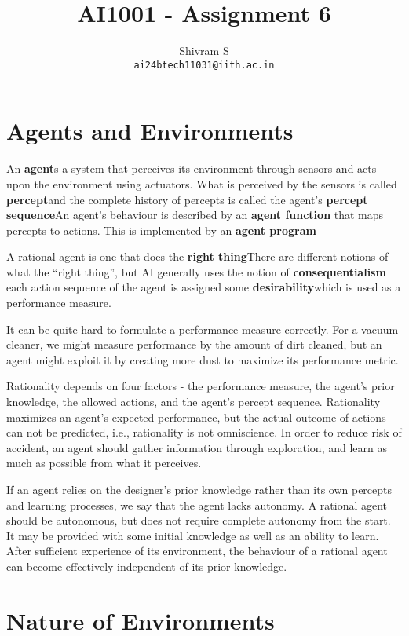 \documentclass{article}
\author{Shivram S \\ \texttt{ai24btech11031@iith.ac.in}}
\title{AI1001 - Assignment 6}
\begin{document}
\maketitle

\section{Agents and Environments}

An \textbf{agent}s a system that perceives its environment through sensors and acts
upon the environment using actuators. What is perceived by the sensors is called
\textbf{percept}and the complete history of percepts is called the agent's
\textbf{percept sequence}An agent's behaviour is described by an \textbf{agent function}
that maps percepts to actions. This is implemented by an \textbf{agent program}

A rational agent is one that does the \textbf{right thing}There are different notions
of what the ``right thing'', but AI generally uses the notion of \textbf{consequentialism} 
each action sequence of the agent is assigned some \textbf{desirability}which is used
as a performance measure.

It can be quite hard to formulate a performance measure correctly. For a vacuum cleaner,
we might measure performance by the amount of dirt cleaned, but an agent might exploit it
by creating more dust to maximize its performance metric.

Rationality depends on four factors - the performance measure, the agent's prior knowledge,
the allowed actions, and the agent's percept sequence. Rationality maximizes an agent's
expected performance, but the actual outcome of actions can not be predicted, i.e.,
rationality is not omniscience. In order to reduce risk of accident, an agent should gather
information through exploration, and learn as much as possible from what it perceives. 

If an agent relies on the designer's prior knowledge rather than its own percepts and 
learning processes, we say that the agent lacks autonomy. A rational agent should be
autonomous, but does not require complete autonomy from the start. It may be provided with
some initial knowledge as well as an ability to learn. After sufficient
experience of its environment, the behaviour of a rational agent can become effectively
independent of its prior knowledge.

\section{Nature of Environments}
\end{document}
